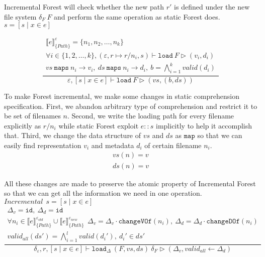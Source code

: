 \documentclass[10pt,twoside,a4paper]{article}
\theoremstyle{theorem}
\theoremstyle{lemma}
\theoremstyle{property}
\theoremstyle{definition}
\theoremstyle{assumption}
\begin{document}
Incremental Forest will check whether the new path $r'$ is defined under the new file system $\delta_F~F$ and perform the same operation as static Forest does.\\

$\boxed{s = [ s \mid x \in e]}$

\begin{displaymath}
	\frac{\begin{array}{c}
		\llbracket e \rrbracket^{\varepsilon}_{\{Path\}} = \{n_1,n_2,\dots,n_k\}\\
		\forall i \in \{1,2,\dots,k\}, (\varepsilon, r \mapsto r/n_i,s) \vdash \mathtt{load}~F \rhd (v_i, d_i)\\
		vs ~\mathtt{maps} ~n_i \to v_i, ~ds ~\mathtt{maps} ~n_i \to d_i, ~b = \bigwedge_{i=1}^k valid(d_i) 
	\end{array}}
	{\varepsilon, [ s \mid x \in e] \vdash \mathtt{load}~F \rhd (vs,(b,ds)) }
\end{displaymath}

To make Forest incremental, we make some changes in static comprehension specification. First, we abandon arbitrary type of comprehension and restrict it to be set of filenames $n$. Second, we write the loading path for every filename explicitly as $r/n_i$ while static Forest exploit $e\!::\!s$ implicitly to help it accomplish that. Third, we change the data structure of $vs$ and $ds$ as $\mathtt{map}$ so that we can easily find representation $v_i$ and metadata $d_i$ of certain filename $n_i$. 
\begin{eqnarray*}
	vs(n) = v \\
	ds(n) = v 
\end{eqnarray*}

All these changes are made to preserve the atomic property of Incremental Forest so that we can get all the information we need in one operation.\\

$\boxed{Incremental~~ s = [ s \mid x \in e]}$
\begin{displaymath}
	\frac{\begin{array}{c}
		\Delta_v = \mathtt{id}, ~\Delta_d = \mathtt{id}\\
		\forall n_i \in \llbracket e \rrbracket^{\varepsilon_{old}}_{\{Path\}} \cup \llbracket e \rrbracket^{\varepsilon_{new}}_{\{Path\}}~~
		\Delta_v = \Delta_v \cdot \mathtt{changeVOf}(n_i),~ \Delta_d = \Delta_d \cdot \mathtt{changeDOf}(n_i)\\
		valid_{all} (ds') = \bigwedge_{i=1}^l valid(d_i'), ~d_i' \in ds'
	\end{array}}
	{\delta_\varepsilon, r, [ s \mid x \in e] \vdash \mathtt{load}_\Delta~ (F,vs,ds)~ \delta_F \rhd (\Delta_v, valid_{all} \leftarrow \Delta_d) }
\end{displaymath}
\end{document}
